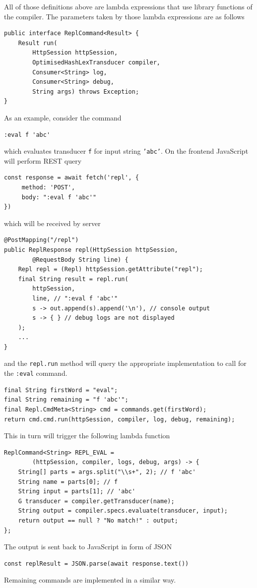 All of those definitions above are lambda expressions that use library functions
of the compiler. The parameters taken by those lambda expressions are as follows
\begin{lstlisting}
public interface ReplCommand<Result> {
    Result run(
        HttpSession httpSession, 
        OptimisedHashLexTransducer compiler, 
        Consumer<String> log, 
        Consumer<String> debug, 
        String args) throws Exception;
}
\end{lstlisting}
As an example, consider the command 
\begin{lstlisting}
:eval f 'abc'
\end{lstlisting}
which evaluates transducer \texttt{f} for input string \texttt{'abc'}. 
On the frontend JavaScript will perform REST query
\begin{lstlisting}
const response = await fetch('repl', {
     method: 'POST',
     body: ":eval f 'abc'"
})
\end{lstlisting}
which will be received by server
\begin{lstlisting}
@PostMapping("/repl")
public ReplResponse repl(HttpSession httpSession, 
        @RequestBody String line) {
    Repl repl = (Repl) httpSession.getAttribute("repl");
    final String result = repl.run(
        httpSession, 
        line, // ":eval f 'abc'"
        s -> out.append(s).append('\n'), // console output
        s -> { } // debug logs are not displayed
    );
    ...
}
\end{lstlisting}
and the \texttt{repl.run} method will query the appropriate implementation to call for
the \texttt{:eval} command.
\begin{lstlisting}     
final String firstWord = "eval";
final String remaining = "f 'abc'";
final Repl.CmdMeta<String> cmd = commands.get(firstWord);
return cmd.cmd.run(httpSession, compiler, log, debug, remaining);
\end{lstlisting}
This in turn will trigger the following lambda function
\begin{lstlisting}
ReplCommand<String> REPL_EVAL = 
        (httpSession, compiler, logs, debug, args) -> {
    String[] parts = args.split("\\s+", 2); // f 'abc'
    String name = parts[0]; // f
    String input = parts[1]; // 'abc'
    G transducer = compiler.getTransducer(name);
    String output = compiler.specs.evaluate(transducer, input);
    return output == null ? "No match!" : output;
};
\end{lstlisting}
The output is sent back to JavaScript in form of JSON
\begin{lstlisting}
const replResult = JSON.parse(await response.text())
\end{lstlisting}
Remaining commands are implemented in a similar way.

